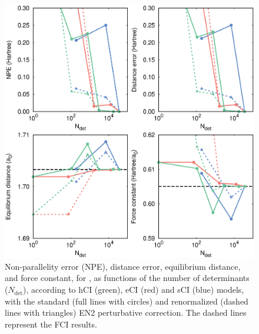 \documentclass[aip,jcp,preprint,noshowkeys,superscriptaddress]{revtex4-1}
\newcommand{\Ndet}{N_\text{det}}
\begin{document}
\begin{figure}%
\includegraphics[width=1.0\linewidth]{plot_pt2_rpt2_H4}
\caption{
Non-parallelity error (NPE), distance error, equilibrium distance, and force constant, for ,
as functions of the number of determinants ($\Ndet$), according to hCI (green), eCI (red) and sCI (blue) models,
with the standard (full lines with circles) and renormalized (dashed lines with triangles) EN2 perturbative correction.
The dashed lines represent the FCI results.}
\label{fig:plot_pt2_rpt2_h4}
\end{figure}
\end{document}
